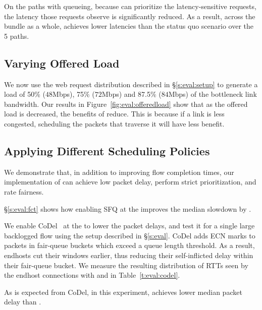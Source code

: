 On the paths with queueing, because \name can prioritize the latency-sensitive requests, the latency those requests observe is significantly reduced. As a result, across the bundle as a whole, \name achieves \realworldMedianLatencyImprovement lower latencies than the status quo scenario over the 5 paths.



\begin{Appendix}
\section{Varying Offered Load}\label{s:eval:offeredload}
We now use the web request distribution described in \S\ref{s:eval:setup} to generate a load of 50\% ($48$Mbps), 75\% ($72$Mbps) and 87.5\% ($84$Mbps) of the bottleneck link bandwidth. Our results in Figure~\ref{fig:eval:offeredload} show that as the offered load is decreased, the benefits of \name reduce. This is because if a link is less congested, scheduling the packets that traverse it will have less benefit.


\end{Appendix}

\subsection{Applying Different Scheduling Policies}\label{s:eval:policies}
We demonstrate that, in addition to improving flow completion times, our implementation of \name can achieve low packet delay, perform strict prioritization, and rate fairness.

 \S\ref{s:eval:fct} shows how enabling SFQ at the \name improves the median slowdown by \overviewBenefitsBundlerMedianImprovement.

We enable CoDel~\cite{fq-codel} at the \inbox to lower the packet delays, and test it for a single large backlogged flow using the setup described in \S\ref{s:eval}.
CoDel adds ECN marks to packets in fair-queue buckets which exceed a queue length threshold. 
As a result, endhosts cut their windows earlier, thus reducing their self-inflicted delay within their fair-queue bucket.
We measure the resulting distribution of RTTs seen by the endhost connections with \name and \baseline in Table~\ref{t:eval:codel}.

As is expected from CoDel, \name in this experiment, achieves \delaysImprovement lower median packet delay than \baseline.


